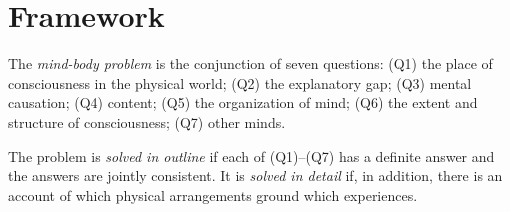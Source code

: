 \documentclass{situationist-preprint}
\begin{document}
\section{Framework}

\begin{definition}\label{d:cluster}
The \emph{mind-body problem} is the conjunction of seven questions: (Q1) the place of consciousness in the physical world; (Q2) the explanatory gap; (Q3) mental causation; (Q4) content; (Q5) the organization of mind; (Q6) the extent and structure of consciousness; (Q7) other minds.
\end{definition}

\begin{definition}\label{d:outline}
The problem is \emph{solved in outline} if each of (Q1)--(Q7) has a definite answer and the answers are jointly consistent. It is \emph{solved in detail} if, in addition, there is an account of which physical arrangements ground which experiences.
\end{definition}
\end{document}
